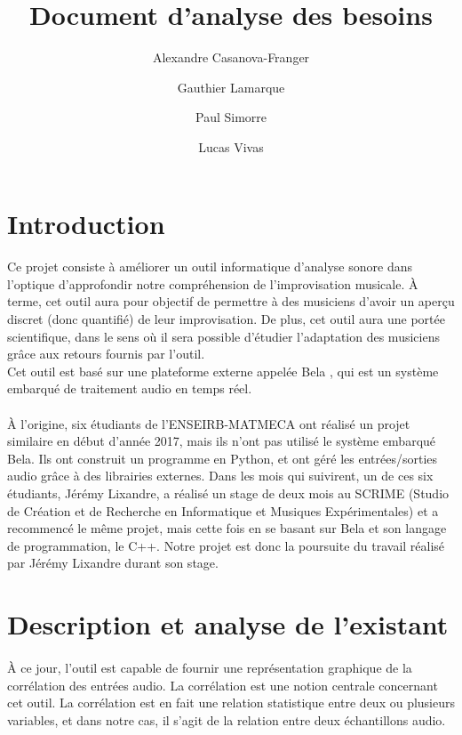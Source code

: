 \documentclass{article}
\title{Document d'analyse des besoins}
\author{Alexandre Casanova-Franger\\
        \and
        Gauthier Lamarque\\
        \and
        Paul Simorre\\
        \and
        Lucas Vivas\\}
\begin{document}
\maketitle
\section{Introduction}
\paragraph{}
Ce projet consiste à améliorer un outil informatique d'analyse sonore dans
l'optique d'approfondir notre compréhension de l'improvisation musicale. À
terme, cet outil aura pour objectif de permettre à des musiciens d'avoir un
aperçu discret (donc quantifié) de leur improvisation. De plus, cet outil aura
une portée scientifique, dans le sens où il sera possible d'étudier l'adaptation
des musiciens grâce aux retours fournis par l'outil. \\
Cet outil est basé sur une plateforme externe appelée Bela \cite{BELA},
qui est un système embarqué de traitement audio en temps réel.
\paragraph{}
À l'origine, six étudiants de l'ENSEIRB-MATMECA ont réalisé un projet similaire
en début d'année 2017, mais ils n'ont pas utilisé le système embarqué Bela. Ils
ont construit un programme en Python, et ont géré les entrées/sorties audio
grâce à des librairies externes. Dans les mois qui suivirent, un de ces six
étudiants, Jérémy Lixandre, a réalisé un stage de deux mois au SCRIME (Studio
de Création et de Recherche en Informatique et Musiques Expérimentales) et a
recommencé le même projet, mais cette fois en se basant sur Bela et son langage
de programmation, le C++. Notre projet est donc la poursuite du travail réalisé
par Jérémy Lixandre durant son stage.
\section{Description et analyse de l'existant}
\paragraph{}
À ce jour, l'outil est capable de fournir une représentation graphique de la
corrélation des entrées audio. La corrélation est une notion centrale
concernant cet outil. La corrélation est en fait une relation statistique
entre deux ou plusieurs variables, et dans notre cas, il s'agit de la
relation entre deux échantillons audio.
\end{document}
